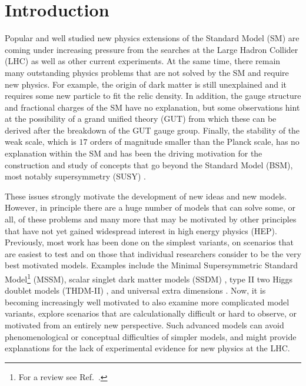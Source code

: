 \documentclass[final,3p,11pt,pdflatex]{elsarticle}
\begin{document}
\clearpage
\tableofcontents

\newpage
\section{Introduction}

Popular and well studied new physics extensions of the Standard Model
(SM) are coming under increasing pressure from the searches
at the Large Hadron Collider (LHC) as well as other current experiments.
At the same time, there remain many outstanding physics problems that are not
solved by the SM and require new physics.  For example, the origin of dark
matter is still unexplained and it requires some new particle
to fit the relic density.  In addition, the gauge structure and
fractional charges of the SM have no explanation, but some
observations hint at the possibility of a grand unified theory (GUT)
from which these can be derived after the breakdown of the GUT gauge
group.  Finally, the stability of the weak scale, which is $17$ orders
of magnitude smaller than the Planck scale, has no explanation within
the SM and has been the driving motivation for the construction and study
of concepts that go beyond the Standard Model (BSM), most notably supersymmetry
(SUSY) \cite{Weinberg:1975gm, Weinberg:1979bn, Gildener:1976ai,Susskind:1978ms,
  tHooft:1980xss}.

These issues strongly motivate the development of new ideas and new
models.  However, in principle there are a huge number of models that
can solve some, or all, of these problems and many more that may be
motivated by other principles that have not yet gained widespread
interest in high energy physics (HEP)\@. Previously, most work has
been done on the simplest variants, on scenarios that are easiest to
test and on those that individual researchers consider to be the very
best motivated models. Examples include the Minimal Supersymmetric
Standard Model\footnote{For a review see Ref.\ \cite{Chung:2003fi}.}
(MSSM), scalar singlet dark matter models (SSDM)
\cite{Silveira:1985rk,McDonald:1993ex,Burgess:2000yq}, type II two
Higgs doublet models (THDM-II) \cite{Lee:1973iz,Glashow:1976nt,
  Donoghue:1978cj}, and universal extra dimensions
\cite{Appelquist:2000nn}.  Now, it is becoming increasingly well
motivated to also examine more complicated model variants, explore
scenarios that are calculationally difficult or hard to observe, or
motivated from an entirely new perspective.  Such advanced models can
avoid phenomenological or conceptual difficulties of simpler models,
and might provide explanations for the lack of experimental evidence
for new physics at the LHC.
\end{document}
